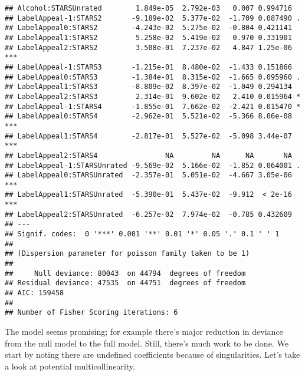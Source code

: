 \documentclass[
]{article}
\begin{document}
\begin{verbatim}
## Alcohol:STARSUnrated        1.849e-05  2.792e-03   0.007 0.994716    
## LabelAppeal-1:STARS2       -9.189e-02  5.377e-02  -1.709 0.087490 .  
## LabelAppeal0:STARS2        -4.243e-02  5.275e-02  -0.804 0.421141    
## LabelAppeal1:STARS2         5.258e-02  5.419e-02   0.970 0.331901    
## LabelAppeal2:STARS2         3.508e-01  7.237e-02   4.847 1.25e-06 ***
## LabelAppeal-1:STARS3       -1.215e-01  8.480e-02  -1.433 0.151866    
## LabelAppeal0:STARS3        -1.384e-01  8.315e-02  -1.665 0.095960 .  
## LabelAppeal1:STARS3        -8.809e-02  8.397e-02  -1.049 0.294134    
## LabelAppeal2:STARS3         2.314e-01  9.602e-02   2.410 0.015964 *  
## LabelAppeal-1:STARS4       -1.855e-01  7.662e-02  -2.421 0.015470 *  
## LabelAppeal0:STARS4        -2.962e-01  5.521e-02  -5.366 8.06e-08 ***
## LabelAppeal1:STARS4        -2.817e-01  5.527e-02  -5.098 3.44e-07 ***
## LabelAppeal2:STARS4                NA         NA      NA       NA    
## LabelAppeal-1:STARSUnrated -9.569e-02  5.166e-02  -1.852 0.064001 .  
## LabelAppeal0:STARSUnrated  -2.357e-01  5.051e-02  -4.667 3.05e-06 ***
## LabelAppeal1:STARSUnrated  -5.390e-01  5.437e-02  -9.912  < 2e-16 ***
## LabelAppeal2:STARSUnrated  -6.257e-02  7.974e-02  -0.785 0.432609    
## ---
## Signif. codes:  0 '***' 0.001 '**' 0.01 '*' 0.05 '.' 0.1 ' ' 1
## 
## (Dispersion parameter for poisson family taken to be 1)
## 
##     Null deviance: 80043  on 44794  degrees of freedom
## Residual deviance: 47535  on 44751  degrees of freedom
## AIC: 159458
## 
## Number of Fisher Scoring iterations: 6
\end{verbatim}

The model seems promising; for example there's major reduction in
deviance from the null model to the full model. Still, there's much work
to be done. We start by noting there are undefined coefficients because
of singularities. Let's take a look at potential multicollinearity.
\end{document}
